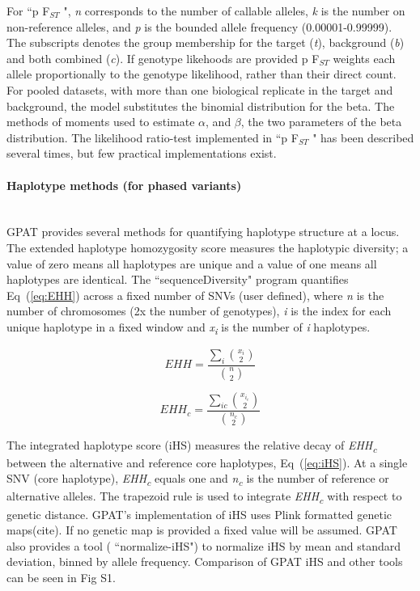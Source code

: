 \documentclass[10pt,letterpaper]{article}
\begin{document}
For ``p F$_{ST}$ ", \textit{n} corresponds to the number of callable alleles, \textit{k} is the number on non-reference alleles, and \textit{p} is the bounded allele frequency (0.00001-0.99999).  The subscripts denotes the group membership for the target (\textit{t}), background (\textit{b}) and both combined (\textit{c}).  If genotype likehoods are provided p F$_{ST}$  weights each allele proportionally to the genotype likelihood, rather than their direct count.   For pooled datasets, with more than one biological replicate in the target and background, the model substitutes the binomial distribution for the beta.  The methods of moments used to estimate $\alpha$, and $\beta$, the two parameters of the beta distribution.  The likelihood ratio-test implemented in ``p F$_{ST}$ " has been described several times\cite{kim,heng}, but few practical implementations exist.  

\paragraph*{Haplotype methods (for phased variants) }\mbox{} \\

GPAT provides several methods for quantifying haplotype structure at a locus.  The extended haplotype homozygosity score measures the haplotypic diversity; a value of zero means all haplotypes are unique and a value of one means all haplotypes are identical. The ``sequenceDiversity" program quantifies Eq~(\ref{eq:EHH}) across a fixed number of SNVs (user defined), where \textit{n} is the number of chromosomes (2x the number of genotypes), \textit{i} is the index for each unique haplotype in a fixed window and \textit{x\textsubscript{i}} is the number of \textit{i} haplotypes.  


\begin{equation}\label{eq:EHH} 
EHH=\frac{\sum_{i} \binom{x_i}{2}}{\binom{n}{2}}
\end{equation}

\begin{equation}\label{eq:EHHC} 
EHH_c=\frac{\sum_{ic} \binom{x_i_c}{2}}{\binom{n_c}{2}}
\end{equation}


The integrated haplotype score (iHS) measures the relative decay of \textit{EHH\textsubscript{c}} between the alternative and reference core haplotypes,  Eq~(\ref{eq:iHS}).  At a single SNV (core haplotype), \textit{EHH\textsubscript{c}} equals one and \textit{n\textsubscript{c}} is the number of reference or alternative alleles.  The trapezoid rule is used to integrate  \textit{EHH\textsubscript{c}} with respect to genetic distance.  GPAT's implementation of iHS uses Plink formatted genetic maps(cite).  If no genetic map is provided a fixed value will be assumed.  GPAT also provides a tool ( ``normalize-iHS") to normalize iHS by mean and standard deviation, binned by allele frequency.  Comparison of GPAT iHS and other tools can be seen in Fig S1\cite{selscan}\cite{voight}.
\end{document}
